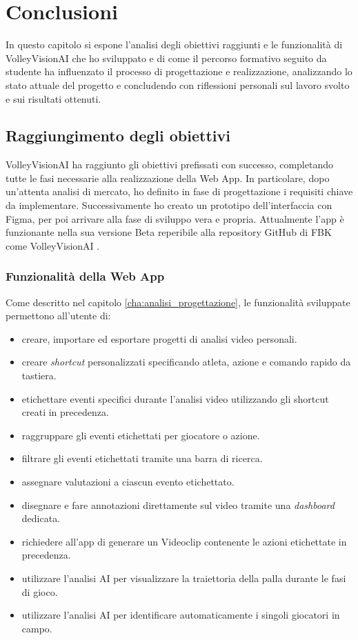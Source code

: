 \chapter{Conclusioni}
\label{cha:conclusioni}

In questo capitolo si espone l'analisi degli obiettivi raggiunti e le funzionalità di VolleyVisionAI che ho sviluppato e di come il percorso formativo seguito da studente ha influenzato il processo di progettazione e realizzazione, analizzando lo stato attuale del progetto e concludendo con riflessioni personali sul lavoro svolto e sui risultati ottenuti.

\section{Raggiungimento degli obiettivi}

VolleyVisionAI ha raggiunto gli obiettivi prefissati con successo, completando tutte le fasi necessarie alla realizzazione della Web App. 
In particolare, dopo un'attenta analisi di mercato, ho definito in fase di progettazione i requisiti chiave da implementare. Successivamente ho creato un prototipo dell'interfaccia con Figma, per poi arrivare alla fase di sviluppo vera e propria. Attualmente l'app è funzionante nella sua versione Beta reperibile alla repository GitHub di FBK come VolleyVisionAI \cite{VolleyVisionAI}.






\subsection{Funzionalità della Web App}

Come descritto nel capitolo \ref{cha:analisi_progettazione}, le funzionalità sviluppate permettono all'utente di: 
\begin{itemize}
    \item creare, importare ed esportare progetti di analisi video personali.
    \item creare \textit{shortcut} personalizzati specificando atleta, azione e comando rapido da tastiera.
    \item etichettare eventi specifici durante l'analisi video utilizzando gli shortcut creati in precedenza.
    \item raggruppare gli eventi etichettati per giocatore o azione. 
    \item filtrare gli eventi etichettati tramite una barra di ricerca.
    \item assegnare valutazioni a ciascun evento etichettato.
    \item disegnare e fare annotazioni direttamente sul video tramite una \textit{dashboard} dedicata. 
    \item richiedere all'app di generare un Videoclip contenente le azioni etichettate in precedenza.
    \item utilizzare l'analisi AI per visualizzare la traiettoria della palla durante le fasi di gioco.
    \item utilizzare l'analisi AI per identificare automaticamente i singoli giocatori in campo.
\end{itemize}



